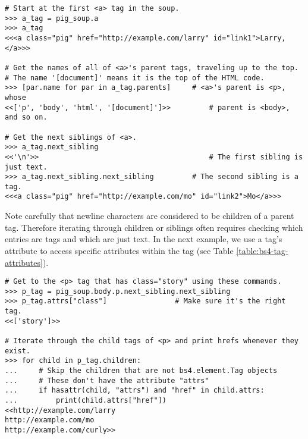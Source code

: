 \begin{lstlisting}
# Start at the first <a> tag in the soup.
>>> a_tag = pig_soup.a
>>> a_tag
<<<a class="pig" href="http://example.com/larry" id="link1">Larry,</a>>>

# Get the names of all of <a>'s parent tags, traveling up to the top.
# The name '[document]' means it is the top of the HTML code.
>>> [par.name for par in a_tag.parents]     # <a>'s parent is <p>, whose
<<['p', 'body', 'html', '[document]']>>         # parent is <body>, and so on.

# Get the next siblings of <a>.
>>> a_tag.next_sibling
<<'\n'>>                                        # The first sibling is just text.
>>> a_tag.next_sibling.next_sibling         # The second sibling is a tag.
<<<a class="pig" href="http://example.com/mo" id="link2">Mo</a>>>
\end{lstlisting}
\begin{comment} %
# Alternatively, get all siblings past <a> at once.
>>> list(a_tag.next_siblings)
<<['\n',
 <a class="pig" href="http://example.com/mo" id="link2">Mo</a>,
 ', and\n',
 <a class="pig" href="http://example.com/curly" id="link3">Curly.</a>,
 '\n',
 <p>The three pigs had an odd fascination with experimental construction.</p>,
 '\n',
 <p>...</p>,
 '\n']>>
\end{comment}

Note carefully that newline characters are considered to be children of a parent tag.
Therefore iterating through children or siblings often requires checking which entries are tags and which are just text.
In the next example, we use a tag's  attribute to access specific attributes within the tag (see Table \ref{table:bs4-tag-attributes}).

\begin{lstlisting}
# Get to the <p> tag that has class="story" using these commands.
>>> p_tag = pig_soup.body.p.next_sibling.next_sibling
>>> p_tag.attrs["class"]                # Make sure it's the right tag.
<<['story']>>

# Iterate through the child tags of <p> and print hrefs whenever they exist.
>>> for child in p_tag.children:
...		# Skip the children that are not bs4.element.Tag objects
...		# These don't have the attribute "attrs"
...		if hasattr(child, "attrs") and "href" in child.attrs:
...			print(child.attrs["href"])
<<http://example.com/larry
http://example.com/mo
http://example.com/curly>>
\end{lstlisting}

